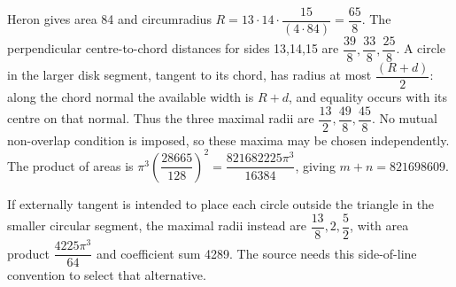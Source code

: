 Heron gives area 84 and circumradius $R=13\cdot14\cdot\dfrac{15}{(4\cdot84)}=\dfrac{65}{8}$. The perpendicular centre-to-chord distances for sides 13,14,15 are $\dfrac{39}{8},\dfrac{33}{8},\dfrac{25}{8}$. A circle in the larger disk segment, tangent to its chord, has radius at most $\dfrac{(R+d)}{2}$: along the chord normal the available width is $R+d$, and equality occurs with its centre on that normal. Thus the three maximal radii are $\dfrac{13}{2},\dfrac{49}{8},\dfrac{45}{8}$. No mutual non-overlap condition is imposed, so these maxima may be chosen independently. The product of areas is $\pi^3(\dfrac{28665}{128})^2=\dfrac{821682225\pi^3}{16384}$, giving $m+n=\boxed{821698609}$.

 If externally tangent is intended to place each circle outside the triangle in the smaller circular segment, the maximal radii instead are $\dfrac{13}{8},2,\dfrac{5}{2}$, with area product $\dfrac{4225\pi^3}{64}$ and coefficient sum 4289. The source needs this side-of-line convention to select that alternative.
